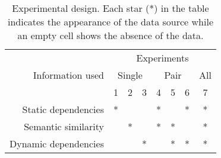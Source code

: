 \begin{table}[h]
    \small
    \caption[Experimental design]{Experimental design. Each star (*) in the table indicates the appearance of the data source while an empty cell shows the absence of the data.}\label{tab:experimental_design}
    \begin{tabular}{r|c|c|c|c|c|c|c}
        \toprule
        \multirow{3}{*}{Information used}& \multicolumn{7}{c}{Experiments}\\
        \cmidrule{2-8}
        & \multicolumn{3}{c|}{Single} & \multicolumn{3}{c|}{Pair} &  \multicolumn{1}{c}{All}\\
        \cmidrule{2-8}
        & 1 & 2 & 3 & 4 & 5 & 6 & 7 \\
        \midrule
        Static dependencies & * & & & * & & * & *\\
        \midrule
        Semantic similarity & & * & & * & * & & *\\
        \midrule
        Dynamic dependencies & & & * & & * & * & *\\
        \bottomrule
    \end{tabular}
\end{table}